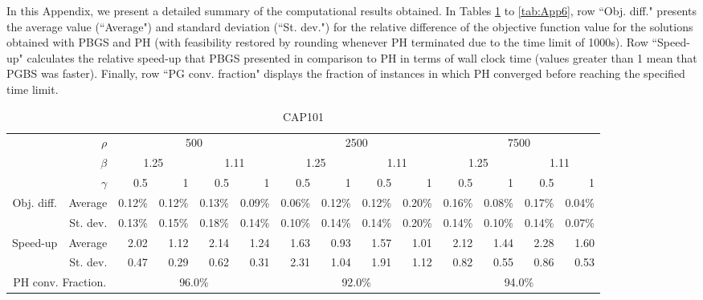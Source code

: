 \documentclass[preprint, 1p, review]{elsarticle}
\begin{document}
In this Appendix, we present a detailed summary of the computational results obtained. In Tables \ref{tab:App1} to \ref{tab:App6}, row ``Obj. diff." presents the average value (``Average") and standard deviation (``St. dev.") for the relative difference of the objective function value for the solutions obtained with PBGS and PH (with feasibility restored by rounding whenever PH terminated due to the time limit of 1000s). Row ``Speed-up" calculates the relative speed-up that PBGS presented in comparison to PH in terms of wall clock time (values greater than 1 mean that PGBS was faster). Finally, row ``PG conv. fraction" displays the fraction of instances in which PH converged before reaching the specified time limit.   

\vskip 0.25in

 \begin{table}[htbp]
   \centering
   \tiny
   \begin{tabular}{crrrrrrrrrrrrr}
     \toprule
     \multirow{3}[6]{*}{} & $\rho$ & \multicolumn{4}{c}{500} & \multicolumn{4}{c}{2500} & \multicolumn{4}{c}{7500} \\
     
        & $\beta$ & \multicolumn{2}{c}{1.25} & \multicolumn{2}{c}{1.11} & \multicolumn{2}{c}{1.25} & \multicolumn{2}{c}{1.11} & \multicolumn{2}{c}{1.25} & \multicolumn{2}{c}{1.11} \\
        & $\gamma$ & 0.5 & 1  & 0.5 & 1  & 0.5 & 1  & 0.5 & 1  & 0.5 & 1  & 0.5 & 1 \\ \midrule
     \multirow{2}[4]{*}{Obj. diff.} & Average & 0.12\% & 0.12\% & 0.13\% & 0.09\% & 0.06\% & 0.12\% & 0.12\% & 0.20\% & 0.16\% & 0.08\% & 0.17\% & 0.04\% \\ 
        &  St. dev. & 0.13\% & 0.15\% & 0.18\% & 0.14\% & 0.10\% & 0.14\% & 0.14\% & 0.20\% & 0.14\% & 0.10\% & 0.14\% & 0.07\% \\
     \multirow{2}[4]{*}{Speed-up} & Average & 2.02 & 1.12 & 2.14 & 1.24 & 1.63 & 0.93 & 1.57 & 1.01 & 2.12 & 1.44 & 2.28 & 1.60 \\
        & St. dev. & 0.47 & 0.29 & 0.62 & 0.31 & 2.31 & 1.04 & 1.91 & 1.12 & 0.82 & 0.55 & 0.86 & 0.53 \\ \midrule
     \multicolumn{2}{c}{PH conv. Fraction.} & \multicolumn{4}{c}{96.0\%} & \multicolumn{4}{c}{92.0\%} & \multicolumn{4}{c}{94.0\%} \\
     \bottomrule
     \end{tabular}   
   \caption{CAP101}
   \label{tab:App1}%
 \end{table}%
\end{document}
